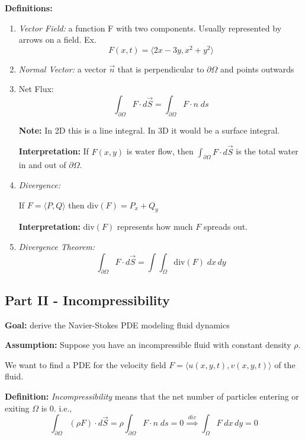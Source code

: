 \documentclass[12pt]{article}
\newcommand{\brak}[1]{\langle #1 \rangle}
\renewcommand{\div}{\text{div}}
\begin{document}
\textbf{Definitions:}
\begin{enumerate}
    \item \emph{Vector Field:} a function F with two components. Usually represented by arrows on a field. Ex. 
    \[F(x, t) = \brak{2x - 3y, x^2 + y^2}\]

    \item \emph{Normal Vector:} a vector $\vec{n}$ that is perpendicular to $\partial \Omega$ and points outwards
    
    \item Net Flux:
    \[\int_{\partial \Omega} F \cdot d\vec{S} = \int_{\partial \Omega} F \cdot n \; ds\]
    
    \textbf{Note:} In 2D this is a line integral. In 3D it would be a surface integral. 

    \textbf{Interpretation:} If $F(x, y)$ is water flow, then $\int_{\partial \Omega} F \cdot d\vec{S}$ is the total water in and out of $\partial \Omega$. 

    \item \emph{Divergence:}
    \begin{center}
        If $F = \brak{P, Q}$ then $\div (F) = P_x + Q_y$
    \end{center}

    \textbf{Interpretation:} $\div(F)$ represents how much $F$ spreads out. 

    \item \emph{Divergence Theorem:}
    \[\int_{\partial \Omega} F \cdot d\vec{S} = \int \int_{\Omega} \div(F) \; dx\, dy\]
\end{enumerate}

\subsection*{Part II - Incompressibility}
\textbf{Goal:} derive the Navier-Stokes PDE modeling fluid dynamics 

\textbf{Assumption:} Suppose you have an incompressible fluid with constant density $\rho$.

We want to find a PDE for the velocity field $F = \brak{u(x, y, t), v(x, y, t)}$ of the fluid.

\textbf{Definition:} \emph{Incompressibility} means that the net number of particles entering or exiting $\Omega$ is 0. i.e., 
\[\int_{\partial \Omega}(\rho F)\cdot d\vec{S} = \rho \int_{\partial \Omega}F \cdot n \; ds = 0 \overset{div}{\implies} \int_{\Omega} F\; dx\, dy = 0\]
\end{document}
